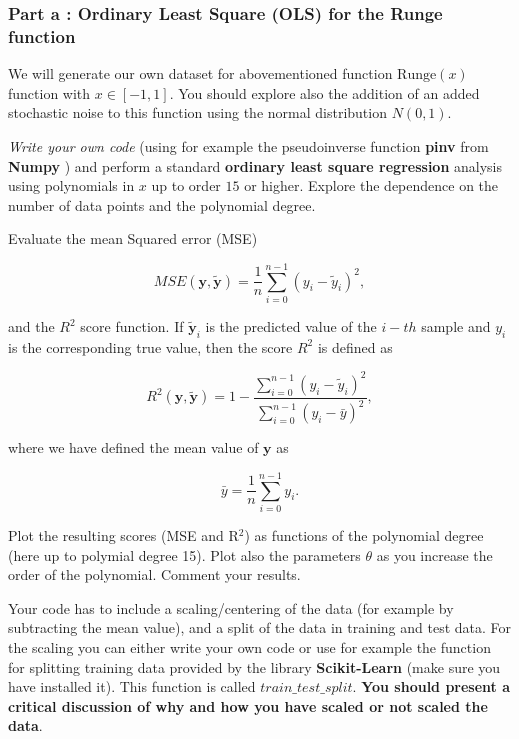 \documentclass[11pt]{article}
\begin{document}
    \hypertarget{part-a-ordinary-least-square-ols-for-the-runge-function}{%
\subsubsection*{Part a : Ordinary Least Square (OLS) for the Runge
function}\label{part-a-ordinary-least-square-ols-for-the-runge-function}}

We will generate our own dataset for abovementioned function
\(\mathrm{Runge}(x)\) function with \(x\in [-1,1]\). You should explore
also the addition of an added stochastic noise to this function using
the normal distribution \(N(0,1)\).

\emph{Write your own code} (using for example the pseudoinverse function
\textbf{pinv} from \textbf{Numpy} ) and perform a standard
\textbf{ordinary least square regression} analysis using polynomials in
\(x\) up to order \(15\) or higher. Explore the dependence on the number
of data points and the polynomial degree.

Evaluate the mean Squared error (MSE)

    \[
MSE(\boldsymbol{y},\tilde{\boldsymbol{y}}) = \frac{1}{n}
\sum_{i=0}^{n-1}(y_i-\tilde{y}_i)^2,
\]

    and the \(R^2\) score function. If \(\tilde{\boldsymbol{y}}_i\) is the
predicted value of the \(i-th\) sample and \(y_i\) is the corresponding
true value, then the score \(R^2\) is defined as

    \[
R^2(\boldsymbol{y}, \tilde{\boldsymbol{y}}) = 1 - \frac{\sum_{i=0}^{n - 1} (y_i - \tilde{y}_i)^2}{\sum_{i=0}^{n - 1} (y_i - \bar{y})^2},
\]

    where we have defined the mean value of \(\boldsymbol{y}\) as

    \[
\bar{y} =  \frac{1}{n} \sum_{i=0}^{n - 1} y_i.
\]

    Plot the resulting scores (MSE and R\(^2\)) as functions of the
polynomial degree (here up to polymial degree 15). Plot also the
parameters \(\theta\) as you increase the order of the polynomial.
Comment your results.

Your code has to include a scaling/centering of the data (for example by
subtracting the mean value), and a split of the data in training and
test data. For the scaling you can either write your own code or use for
example the function for splitting training data provided by the library
\textbf{Scikit-Learn} (make sure you have installed it). This function
is called \(train\_test\_split\). \textbf{You should present a critical
discussion of why and how you have scaled or not scaled the data}.
\end{document}
